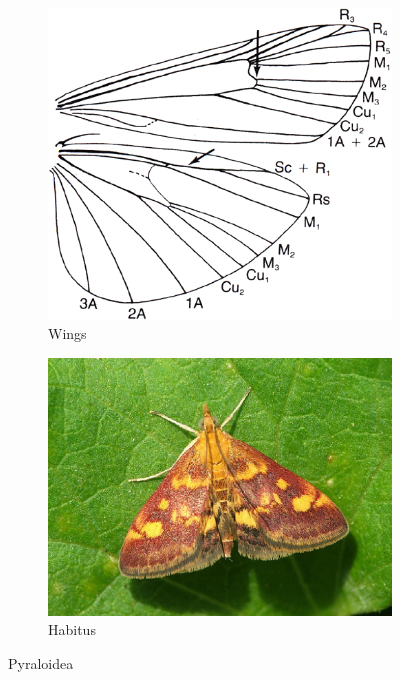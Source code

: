 \documentclass[letterpaper, 11pt]{article}
\begin{document}
\begin{figure}[ht!]
    \centering
    \begin{subfigure}[ht!]{0.38\textwidth}
        \includegraphics[width=\textwidth]{image20}
        \caption{Wings}
        \label{fig:pyraloid1}
    \end{subfigure}
    \qquad %
    \begin{subfigure}[ht!]{0.48\textwidth}
        \includegraphics[width=\textwidth]{image19}
        \caption{Habitus}
        \label{fig:pyraloid2}
    \end{subfigure}
    \caption{Pyraloidea}\label{fig:pyraloids}
\end{figure}
\end{document}
